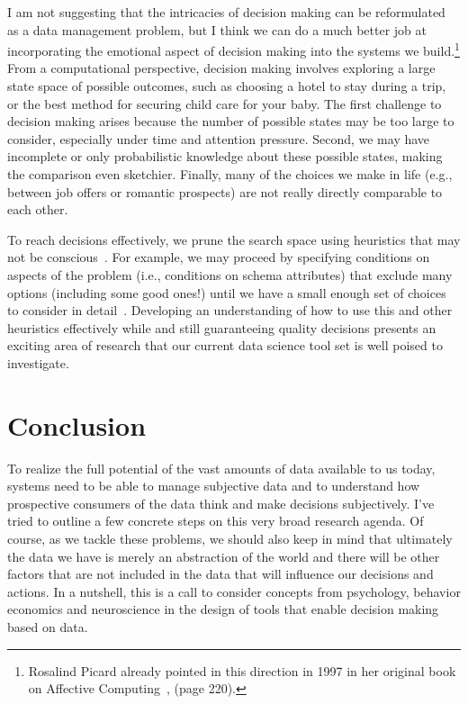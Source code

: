 \documentclass[11pt]{article}
\begin{document}
I am not suggesting that the intricacies of decision making can be reformulated as a data management problem, but I think we can do a much better job at incorporating the emotional aspect of decision making into the systems we build.\footnote{Rosalind Picard already pointed in this direction in 1997 in her original book on Affective Computing~\cite{picard-book}, (page 220).} 
From a computational perspective, decision making involves exploring a large state space of possible outcomes, such as choosing a hotel to stay during a trip, or the best method for securing child care for your baby. The first challenge to decision making arises because the number of possible states may be too large to consider,  especially under time and attention pressure. Second, we may have incomplete or only probabilistic knowledge about these possible states, making the comparison even sketchier. Finally, many of the choices we make in life (e.g., between job offers or romantic prospects) are not really directly comparable  to each other.

To reach decisions effectively, we prune the search space using heuristics that may not be conscious~\cite{nudge}. For example, we may proceed by specifying conditions on aspects of the problem (i.e., conditions on schema attributes) that exclude many options (including some good ones!) until we have a small enough set of choices to consider in detail~\cite{tversky72}.  Developing an understanding of how to use this and other heuristics effectively while and still guaranteeing quality decisions presents an exciting area of research that our current data science tool set is well poised to investigate.

\section{Conclusion}
To  realize the full potential of the vast amounts of data available to us today, systems need to be able to manage subjective data and to understand how prospective consumers of the data think and make decisions subjectively. I've tried to outline a few concrete steps on this very broad research agenda. Of course, as we tackle these problems, we should also keep in mind that ultimately the data we have is merely an abstraction of the world and there will be other factors that are not included in the data that will influence our decisions and actions. In a nutshell, this is a call to consider concepts from psychology, behavior economics and neuroscience in the design of tools that enable decision making based on data. 
\end{document}
